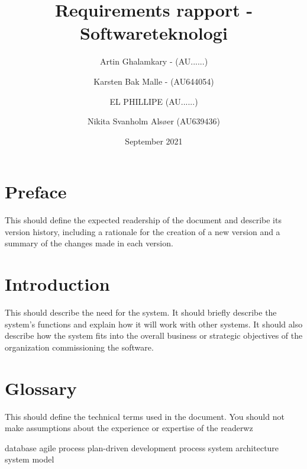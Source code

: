 \documentclass{article}
\title{Requirements rapport - Softwareteknologi} %
\author{Artin Ghalamkary - (AU......) \and Karsten Bak Malle - (AU644054) \and EL PHILLIPE (AU......) \and Nikita Svanholm Alsøer (AU639436)}%
\date{September 2021}
\begin{document}
\maketitle
\section*{Preface}
This should define the expected readership of the document and describe its version history, including a
rationale for the creation of a new version and a summary of the changes made in each version.

\section*{Introduction}
This should describe the need for the system. It should briefly describe the system’s functions and
explain how it will work with other systems. It should also describe how the system fits into the overall
business or strategic objectives of the organization commissioning the software.

\section*{Glossary}
This should define the technical terms used in the document. You should not make assumptions about the
experience or expertise of the readerwz

database
agile process
plan-driven development process
system architecture
system model
\end{document}
